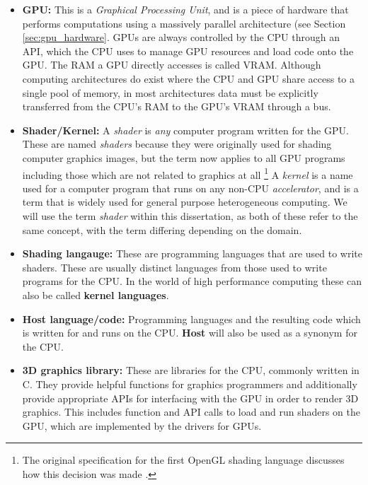 \documentclass[a4paper,12pt,twoside,openright]{report}
\begin{document}
\begin{itemize}

    \item \textbf{GPU:} This is a \textit{Graphical Processing Unit}, and is a
    piece of hardware that performs computations using a massively parallel
    architecture (see Section \ref{sec:gpu_hardware}. GPUs are always
    controlled by the CPU through an API, which the CPU uses to manage GPU
    resources and load code onto the GPU. The RAM a GPU directly accesses is
    called VRAM. Although computing architectures do exist where the CPU and
    GPU share access to a single pool of memory, in most architectures data
    must be explicitly transferred from the CPU's RAM to the GPU's VRAM through
    a bus.

    \item \textbf{Shader/Kernel:} A \textit{shader} is \textit{any} computer
    program written for the GPU. These are named \textit{shaders} because they
    were originally used for shading computer graphics images, but the term now
    applies to all GPU programs including those which are not related to
    graphics at all \footnote{The original specification for the first OpenGL
    shading language discusses how this decision was made \cite{GLSL_1_10}.} A
    \textit{kernel} is a name used for a computer program that runs on any
    non-CPU \textit{accelerator}, and is a term that is widely used for general
    purpose heterogeneous computing. We will use the term \textit{shader}
    within this dissertation, as both of these refer to the same concept, with
    the term differing depending on the domain.

    \item \textbf{Shading langauge:} These are programming languages that are
    used to write shaders. These are usually distinct languages from those used
    to write programs for the CPU. In the world of high performance computing
    these can also be called \textbf{kernel languages}.

    \item \textbf{Host language/code:} Programming languages and the resulting
    code which is written for and runs on the CPU. \textbf{Host} will also be
    used as a synonym for the CPU.

    \item \textbf{3D graphics library:} These are libraries for the CPU,
    commonly written in C. They provide helpful functions for graphics
    programmers and additionally provide appropriate APIs for interfacing with
    the GPU in order to render 3D graphics. This includes function and API
    calls to load and run shaders on the GPU, which are implemented by the
    drivers for GPUs.


\end{itemize}
\end{document}
